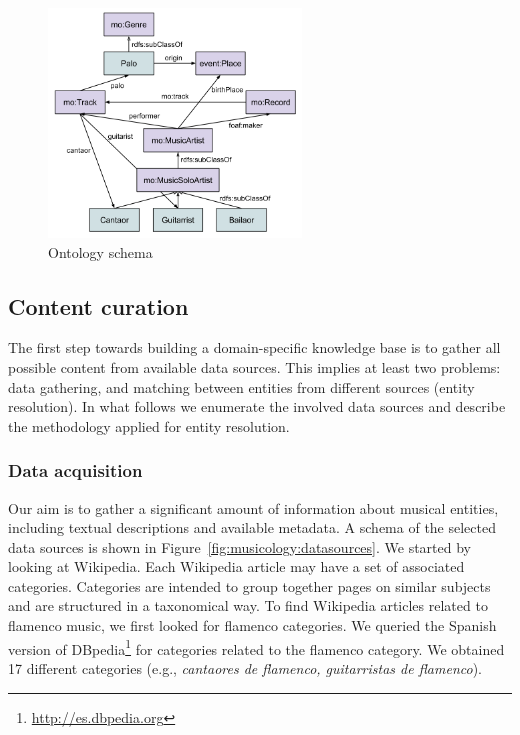 \begin{figure}
	\centering
	\includegraphics[width=0.60\textwidth]{ch05_musicology_pics/flabase_ontology2.png}
	\caption{Ontology schema \label{fig:musicology:ontology}}
\end{figure}


\subsection{Content curation}
\label{sec:musicology:kb_curation}

The first step towards building a domain-specific knowledge base is to gather all possible content from available data sources. This implies at least two problems: data gathering, and matching between entities from different sources (entity resolution). In what follows we enumerate the involved data sources and describe the methodology applied for entity resolution.

\subsubsection{Data acquisition}
\label{sec:musicology:datasoruces}

Our aim is to gather a significant amount of information about musical entities, including textual descriptions and available metadata. A schema of the selected data sources is shown in Figure~\ref{fig:musicology:datasources}. We started by looking at Wikipedia. %
Each Wikipedia article may have a set of associated categories. Categories are intended to group together pages on similar subjects and are structured in a taxonomical way. To find Wikipedia articles related to flamenco music, we first looked for flamenco categories. %
We queried the Spanish version of DBpedia\footnote{\url{http://es.dbpedia.org}} for categories related to the flamenco category. We obtained 17 different categories (e.g., \textit{cantaores de flamenco, guitarristas de flamenco}).

